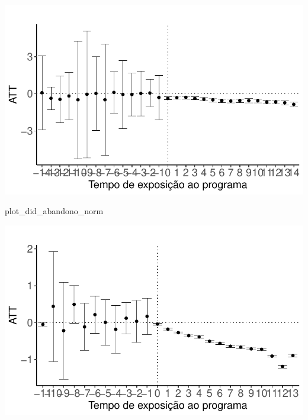 \documentclass[
  letterpaper,
  DIV=11,
  numbers=noendperiod]{scrartcl}
\newenvironment{Shaded}{\begin{snugshade}}{\end{snugshade}}
\newcommand{\NormalTok}[1]{\textcolor[rgb]{0.00,0.23,0.31}{#1}}
\begin{document}
\includegraphics{script_files/figure-latex/unnamed-chunk-24-3.pdf}

\begin{Shaded}
\begin{Highlighting}[]
\NormalTok{plot\_did\_abandono\_norm}
\end{Highlighting}
\end{Shaded}

\includegraphics{script_files/figure-latex/unnamed-chunk-24-4.pdf}
\end{document}
